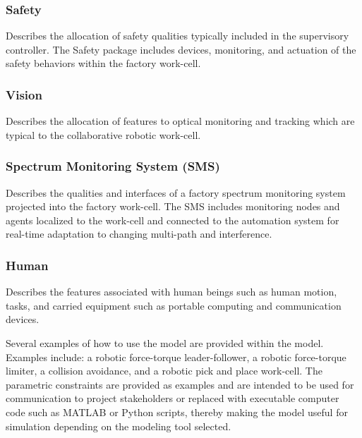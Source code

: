 \documentclass[journal, twoside]{IEEEtran}
\begin{document}
	\subsubsection{Safety} Describes the allocation of safety qualities typically included in the supervisory controller.  The Safety package includes devices, monitoring, and actuation of the safety behaviors within the factory work-cell.
	
	\subsubsection{Vision} Describes the allocation of features to optical monitoring and tracking which are typical to the collaborative robotic work-cell.
	
	\subsubsection{Spectrum Monitoring System (SMS)} Describes the qualities and interfaces of a factory spectrum monitoring system projected into the factory work-cell.  The SMS includes monitoring nodes and agents localized to the work-cell and connected to the automation system for real-time adaptation to changing multi-path and interference. 
	
	\subsubsection{Human} Describes the features associated with human beings such as human motion, tasks, and carried equipment such as portable computing and communication devices.
	\vspace{3mm} 
    
    Several examples of how to use the model are provided within the model\cite{SysML.Candell2018}.  Examples include: a robotic force-torque leader-follower, a robotic force-torque limiter, a collision avoidance, and a robotic pick and place work-cell.  The parametric constraints are provided as examples and are intended to be used for communication to project stakeholders or replaced with executable computer code such as MATLAB or Python scripts, thereby making the model useful for simulation depending on the modeling tool selected.
	
\end{document}

